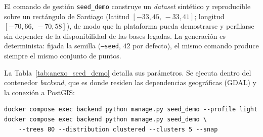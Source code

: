 \label{anx:demo}

El comando de gestión \texttt{seed\_demo} construye un \textit{dataset} sintético y
reproducible sobre un rectángulo de Santiago
(latitud $[-33{,}45,\,-33{,}41]$; longitud $[-70{,}66,\,-70{,}58]$), de modo que la
plataforma pueda demostrarse y perfilarse sin depender de la disponibilidad de las
bases legadas. La generación es determinista: fijada la semilla
(\texttt{--seed}, $42$ por defecto), el mismo comando produce siempre el mismo
conjunto de puntos.

La Tabla~\ref{tab:anexo_seed_demo} detalla sus parámetros. Se ejecuta dentro del
contenedor \textit{backend}, que es donde residen las dependencias geográficas (GDAL)
y la conexión a PostGIS:

\begin{verbatim}
docker compose exec backend python manage.py seed_demo --profile light
docker compose exec backend python manage.py seed_demo \
    --trees 80 --distribution clustered --clusters 5 --snap
\end{verbatim}

